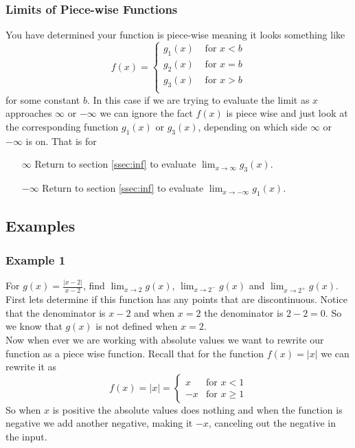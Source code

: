 \documentclass[12pt]{article}
\begin{document}
\subsubsection{Limits of Piece-wise Functions}
\label{ssec:pw-inf}
You have determined your function is piece-wise meaning it looks something like 
 $$f(x)=\begin{cases}
     g_1(x) & \text{ for } x<b\\
     g_2(x) & \text{ for } x=b\\
     g_3(x) & \text{ for } x>b\\
 \end{cases}$$
for some constant $b$. In this case if we are trying to evaluate the limit as $x$ approaches $\infty$ or $-\infty$ we can ignore the fact $f(x)$ is piece wise and just look at the corresponding function $g_1(x)$ or $g_3(x)$, depending on which side $\infty$ or $-\infty$ is on. That is for
\begin{itemize}
    \item[$\infty$] 
    Return to section \ref{ssec:inf} to evaluate $\displaystyle{\lim_{x\to \infty} g_3(x)}$.\\

    \item[$-\infty$] 
    Return to section \ref{ssec:inf} to evaluate $\displaystyle{\lim_{x\to -\infty} g_1(x)}$.\\
\end{itemize}

\subsection{Examples}
\label{ssec:examples}
\subsubsection{Example 1}
\label{ex:abs}
For $g(x)=\frac{|x-2|}{x-2}$, find $\displaystyle{\lim_{x\to 2}g(x)}$, $\displaystyle{\lim_{x\to 2^{-}}g(x)}$ and $\displaystyle{\lim_{x\to 2^{+}}g(x)}$.\\ 
First lets determine if this function has any points that are discontinuous. Notice that the denominator is $x-2$ and when $x=2$ the denominator is $2-2=0$. So we know that $g(x)$ is not defined when $x=2$.\\

Now when ever we are working with absolute values we want to rewrite our function as a piece wise function. Recall that for the function $f(x)=|x|$ we can rewrite it as 
$$f(x)=|x|=\begin{cases}
        x & \text{for } x < 1\\
        -x & \text{for } x \geq 1  
    \end{cases}$$
So when $x$ is positive the absolute values does nothing and when the function is negative we add another negative, making it $-x$, canceling out the negative in the input.\\
\end{document}

